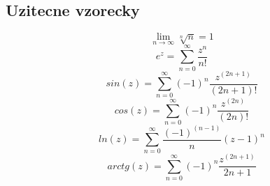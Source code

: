 \subsection*{\label{sec:rozviteFce} Uzitecne vzorecky}
$$\lim_{n \to \infty} \sqrt[n]{n} = 1$$
$$e^z = \sum_{n=0}^\infty \frac{z^n}{n!}$$
$$sin(z) = \sum_{n=0}^\infty (-1)^n \frac{z^{(2n+1)}}{(2n+1)!}$$
$$cos(z) = \sum_{n=0}^\infty (-1)^n \frac{z^{(2n)}}{(2n)!} $$
$$ln(z) = \sum_{n=0}^\infty \frac{(-1)^{(n-1)}}{n}(z-1)^n$$
$$arctg(z) = \sum_{n=0}^\infty (-1)^n \frac{z^{(2n+1)}}{2n+1}$$

\newpage